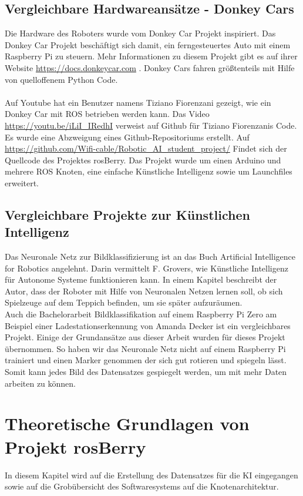 \documentclass[conference]{IEEEtran}
\begin{document}
	\subsection{Vergleichbare Hardwareansätze - Donkey Cars} %
	Die Hardware des Roboters wurde vom Donkey Car Projekt inspiriert.
	Das Donkey Car Projekt beschäftigt sich damit, ein ferngesteuertes Auto mit einem Raspberry Pi zu steuern.
	Mehr Informationen zu diesem Projekt gibt es auf ihrer Website 
	\url{https://docs.donkeycar.com} .
	Donkey Cars fahren größtenteils mit Hilfe von quelloffenem Python Code. \\
	\\
	Auf Youtube hat ein Benutzer namens Tiziano Fiorenzani gezeigt, wie ein Donkey Car mit ROS betrieben werden kann.
	Das Video \url{https://youtu.be/iLiI\_IRedhI}  verweist auf Github für 
	Tiziano 
	Fiorenzanis Code. Es wurde eine Abzweigung eines Github-Repositoriums 
	erstellt. Auf 
	\url{https://github.com/Wifi-cable/Robotic_AI_student_project/}
	Findet sich der Quellcode des Projektes rosBerry. 
	Das Projekt wurde um einen Arduino und mehrere ROS Knoten, eine 
	einfache Künstliche Intelligenz sowie um Launchfiles erweitert.
		
	\subsection{Vergleichbare Projekte zur Künstlichen Intelligenz} 
	Das Neuronale Netz zur Bildklassifizierung ist an das Buch \glqq Artificial Intelligence for Robotics\grqq  \cite{govers2018artificial} angelehnt.
	Darin vermittelt F. Grovers, wie Künstliche Intelligenz für Autonome 
	Systeme funktionieren kann.
	In einem Kapitel beschreibt der Autor, dass der Roboter mit Hilfe von Neuronalen Netzen lernen soll, ob sich Spielzeuge auf dem Teppich befinden, um sie später aufzuräumen.\\
	
	Auch die Bachelorarbeit \glqq Bildklassifikation auf einem Raspberry Pi 
	Zero am Beispiel einer Ladestationserkennung\grqq  \cite{Amanda} von 
	Amanda Decker ist ein vergleichbares Projekt.
	Einige der Grundansätze aus dieser Arbeit wurden für dieses Projekt übernommen.
	So haben wir das Neuronale Netz nicht auf einem Raspberry Pi trainiert und einen Marker genommen der sich gut rotieren und spiegeln lässt.
	Somit kann jedes Bild des Datensatzes gespiegelt werden, um mit mehr 
	Daten arbeiten zu können.
	
	\section{Theoretische Grundlagen von Projekt rosBerry}
	In diesem Kapitel wird auf die Erstellung des Datensatzes für die KI eingegangen sowie auf die Grobübersicht des Softwaresystems auf die Knotenarchitektur. %
	
\end{document}
